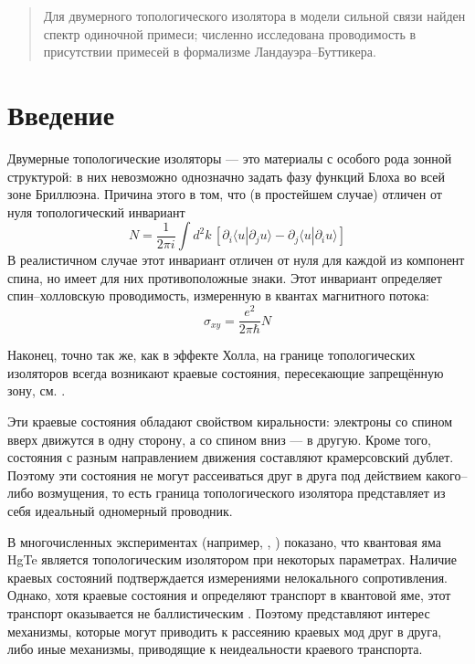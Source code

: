 	\newpage
	\begin{abstract}
        Для двумерного топологического изолятора в модели сильной связи найден 
        спектр одиночной примеси; численно исследована проводимость в присутствии примесей 
        в формализме Ландауэра--Буттикера.
	\end{abstract}
	\section{Введение}
    Двумерные топологические изоляторы --- это материалы 
    с особого рода зонной структурой:
    в них невозможно однозначно задать фазу функций 
    Блоха во всей зоне Бриллюэна. Причина этого в том, что (в простейшем случае) 
    отличен от нуля
    топологический инвариант \cite{Kohmoto1985, Thouless1982}
    \begin{equation}
        \label{TKNN}
        N = \frac{1}{2\pi i} 
            \int d^2 k\, \left[\partial_i \langle u | \partial_j u \rangle -
            \partial_j \langle u | \partial_i u \rangle \right]
    \end{equation}
    В реалистичном случае этот инвариант отличен от нуля для каждой из компонент спина,
    но имеет для них противоположные знаки.
    Этот инвариант определяет спин--холловскую проводимость, 
    измеренную в квантах 
    магнитного потока:
    \begin{equation}
        \sigma_{xy} = \frac{e^2}{2\pi \hbar} N
    \end{equation}
    
    Наконец, точно так же, как в эффекте Холла, 
    на границе топологических изоляторов всегда возникают краевые состояния,
    пересекающие запрещённую зону, см. \cite{Hasan2010}.

    Эти краевые состояния обладают свойством киральности: электроны со спином 
    вверх движутся в одну сторону, а со спином вниз --- в другую. Кроме того, состояния 
    с разным направлением движения составляют крамерсовский дублет. Поэтому
    эти состояния не могут рассеиваться друг в друга 
    под действием какого--либо возмущения, то есть граница топологического 
    изолятора представляет из себя идеальный одномерный проводник.

    В многочисленных экспериментах (например, \cite{Konig2007}, \cite{Gusev2011})
    показано, что квантовая яма HgTe является топологическим изолятором при 
    некоторых параметрах. Наличие краевых состояний подтверждается измерениями
    нелокального сопротивления. Однако, хотя краевые состояния и
    определяют транспорт в квантовой яме, этот транспорт оказывается не баллистическим 
    \cite{Gusev2011}.
    Поэтому представляют интерес механизмы, которые могут приводить
    к рассеянию краевых мод друг в друга, либо иные механизмы, приводящие к неидеальности
    краевого транспорта.

